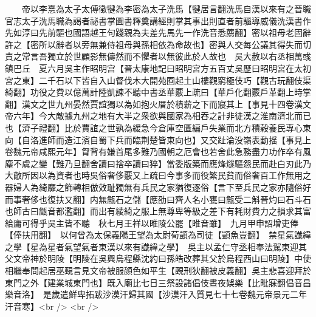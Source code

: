 　　帝以李憙為太子太傅徵犍為李密為太子洗馬【犍居言翻洗馬自漢以來有之晉職官志太子洗馬職為謁者祕書掌圖書釋奠講經則掌其事出則直者前驅導威儀洗漢書作先如淳曰先前驅也國語越王句踐親為夫差先馬先一作洗音悉薦翻】密以祖母老固辭許之【密所以辭者以旁無兼侍祖母與孫相依為命故也】密與人交每公議其得失而切責之常言吾獨立於世顧影無儔然而不懼者以無彼此於人故也　吳大赦以右丞相萬彧鎮巴丘　夏六月吳主作昭明宫【晉太康地記曰昭明宮方五百丈吳歷曰昭明宮在太初宮之東】二千石以下皆自入山督伐木大開苑囿起土山樓觀窮極伎巧【觀古玩翻伎渠綺翻】功役之費以億萬計陸凱諫不聽中書丞華覈上疏曰【華戶化翻覈戶革翻上時掌翻】漢文之世九州晏然賈誼獨以為如抱火厝於積薪之下而寢其上【事見十四卷漢文帝六年】今大敵據九州之地有大半之衆欲與國家為相吞之計非徒漢之淮南濟北而已也【濟子禮翻】比於賈誼之世孰為緩急今倉庫空匱編戶失業而北方積穀養民專心東向【自洛進師而造江濱自蜀下兵而臨荆楚皆東向也】又交趾淪没嶺表動揺【事見上卷魏元帝咸熙元年】胷背有嫌首尾多難乃國朝之厄會也若舍此急務盡力功作卒有風塵不虞之變【難乃旦翻舍讀曰捨卒讀曰猝】當委版築而應烽燧驅怨民而赴白刃此乃大敵所因以為資者也時吳俗奢侈覈又上疏曰今事多而役繁民貧而俗奢百工作無用之器婦人為綺靡之飾轉相倣效耻獨無有兵民之家猶復逐俗【言下至兵民之家亦隨俗好而事奢侈也復扶又翻】内無甔石之儲【應劭曰齊人名小甕曰甔受二斛晉灼曰石斗石也師古曰甔音都濫翻】而出有綾綺之服上無尊卑等級之差下有耗財費力之損求其富給庸可得乎吳主皆不聽　秋七月王祥以睢陵公罷【睢音雖】　九月甲申詔增吏俸【俸扶用翻】　以何曾為太保義陽王望為太尉荀顗為司徒【顗魚豈翻】　禁星氣䜟緯之學【星為星者氣望氣者東漢以來有䜟緯之學】　吳主以孟仁守丞相奉法駕東迎其父文帝神於明陵【明陵在吳興烏程縣沈約曰孫皓改葬其父於烏程西山曰明陵】中使相繼奉問起居巫覡言見文帝被服顔色如平生【覡刑狄翻被皮義翻】吳主悲喜迎拜於東門之外【建業城東門也】既入廟比七日三祭設諸倡伎晝夜娛樂【比毗寐翻倡音昌樂音洛】　是歲遣鮮卑拓跋沙漠汗歸其國【沙漠汗入質見七十七卷魏元帝景元二年汗音寒】<br />
<br />
